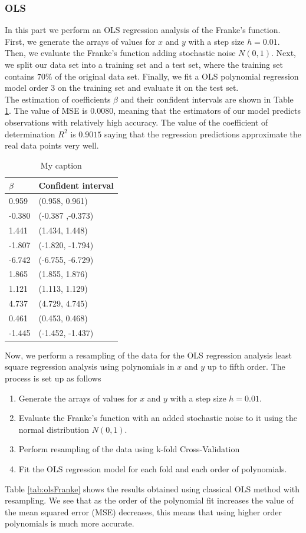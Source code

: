 \documentclass [11pt]{article}
\begin{document}
\subsubsection{OLS}
In this part we perform an OLS regression analysis of the Franke's function. First, we generate the arrays of values for $x$ and $y$ with a step size $h=0.01$. Then, we evaluate the Franke's function adding stochastic noise $N(0,1)$. Next, we split our data set into a training set and a test set, where the training set contains $70\%$ of the original data set. Finally, we fit a OLS polynomial regression model order $3$ on the training set and evaluate it on the test set. \\
The estimation of coefficients $\beta$ and their confident intervals are shown in Table \ref{tab:olsfrane1}. The value of MSE is $0.0080$, meaning that the estimators of our model predicts observations with relatively high accuracy. The value of the coefficient of determination $R^{2}$ is $0.9015$ saying that the regression predictions approximate the real data points very well.
\begin{table}[H]
\centering
\begin{tabular}{ll}
\hline
$\beta$ & Confident interval \\ \hline
0.959   & (0.958, 0.961)     \\
-0.380  & (-0.387 ,-0.373)   \\
1.441   & (1.434, 1.448)     \\
-1.807  & (-1.820,  -1.794)  \\
-6.742  & (-6.755, -6.729)   \\
1.865   & (1.855, 1.876)     \\
1.121   & (1.113, 1.129)     \\
4.737   & (4.729, 4.745)     \\
0.461   & (0.453, 0.468)     \\
-1.445  & (-1.452, -1.437)   \\ \hline
\end{tabular}
\caption{My caption}
\label{tab:olsfrane1}
\end{table}
Now, we perform a resampling of the data for the OLS regression analysis least square regression analysis using polynomials in $x$ and $y$ up to fifth order. The process is set up as follows
\begin{enumerate}
\item Generate the arrays of values for $x$ and $y$ with a step size $h=0.01$. 
\item Evaluate the Franke's function with an added stochastic noise to it using  the normal distribution $N(0,1)$.
\item Perform resampling of the data using k-fold Cross-Validation
\item Fit the OLS regression model for each fold and each order of polynomials.
\end{enumerate}
Table \ref{tab:olsFranke} shows the results obtained using classical OLS method with resampling. We see that as the order of the polynomial fit increases the value of  the mean squared error (MSE) decreases, this means that using higher order polynomials is much more accurate. 
\end{document}
